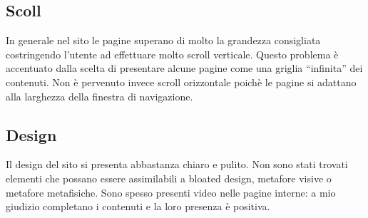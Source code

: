 \documentclass[../ProgettoTecWeb2.tex]{subfiles}
\begin{document}
	\subsection{Scoll}
	In generale nel sito le pagine superano di molto la grandezza consigliata costringendo l'utente ad effettuare molto scroll verticale. Questo problema è accentuato dalla scelta di presentare alcune pagine come una griglia ``infinita'' dei contenuti. Non è pervenuto invece scroll orizzontale poichè le pagine si adattano alla larghezza della finestra di navigazione.

	\subsection{Design}
	Il design del sito si presenta abbastanza chiaro e pulito. Non sono stati trovati elementi che possano essere assimilabili a bloated design, metafore visive o metafore metafisiche. Sono spesso presenti video nelle pagine interne: a mio giudizio completano i contenuti e la loro presenza è positiva.
\end{document}
